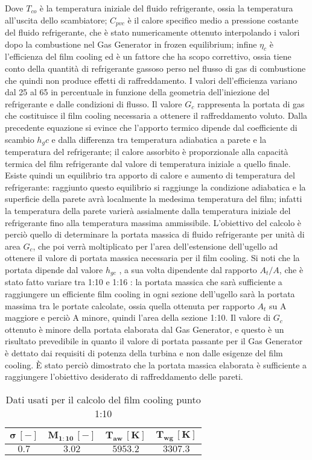 Dove $T_{co}$ è la temperatura iniziale del fluido refrigerante, ossia la temperatura all'uscita dello scambiatore; $C_{pvc}$ è il calore specifico medio a pressione costante del fluido refrigerante, che è stato numericamente ottenuto interpolando i valori dopo la combustione nel Gas Generator in frozen equilibrium; infine $\eta_{c}$ è l'efficienza del film cooling ed è un fattore che ha scopo correttivo, ossia tiene conto della quantità di refrigerante gassoso perso nel flusso di gas di combustione che quindi non produce effetti di raffreddamento. I valori dell'efficienza variano dal 25 al 65 in percentuale in funzione della geometria dell'iniezione del refrigerante e dalle condizioni di flusso. Il valore $G_c$ rappresenta la portata di gas che costituisce il film cooling necessaria a ottenere il raffreddamento voluto.
Dalla precedente equazione si evince che l'apporto termico dipende dal coefficiente di scambio $h_gc$ e dalla differenza tra temperatura adiabatica a parete e la temperatura del refrigerante; il calore assorbito è proporzionale alla capacità termica del film refrigerante dal valore di temperatura iniziale a quello finale. Esiste quindi un equilibrio tra apporto di calore e aumento di temperatura del refrigerante: raggiunto questo equilibrio si raggiunge la condizione adiabatica e la superficie della parete avrà localmente la medesima temperatura del film; infatti la temperatura della parete varierà assialmente dalla temperatura iniziale del refrigerante fino alla temperatura massima ammissibile.
L'obiettivo del calcolo è perciò quello di determinare la portata massica di fluido refrigerante per unità di area $G_c$, che poi verrà moltiplicato per l'area dell'estensione dell'ugello ad ottenere il valore di portata massica necessaria per il film cooling. Si noti che la portata dipende dal valore $h_{gc}$ , a sua volta dipendente dal rapporto $A_t/A$, che è stato fatto variare tra 1:10 e 1:16 : la portata massica che sarà sufficiente a raggiungere un efficiente film cooling in ogni sezione dell'ugello sarà la portata massima tra le portate calcolate, ossia quella ottenuta per rapporto $A_t$ su A maggiore e perciò A minore, quindi l'area della sezione 1:10. Il valore di $G_c$ ottenuto è minore della portata elaborata dal Gas Generator, e questo è un risultato prevedibile in quanto il valore di portata passante per il Gas Generator è dettato dai requisiti di potenza della turbina e non dalle esigenze del film cooling. È stato perciò dimostrato che la portata massica elaborata è sufficiente a raggiungere l'obiettivo desiderato di raffreddamento delle pareti.
\begin{table}[H]
\centering
\begin{tabular}{|c|c|c|c|}
\hline
$\bm{\sigma \, [-]}$ & $\bm{M_{1:10} \, [-]}$ & $\bm{T_{aw} \, [K]}$  & $\bm{T_{wg} \, [K]}$ \\
\hline
$0.7$ & $3.02$ & $  5953.2 $  & $  3307.3 $ \\
\hline
\end{tabular}
\caption{Dati usati per il calcolo del film cooling punto 1:10}
\label{table:tabella_film_in}
\end{table}

